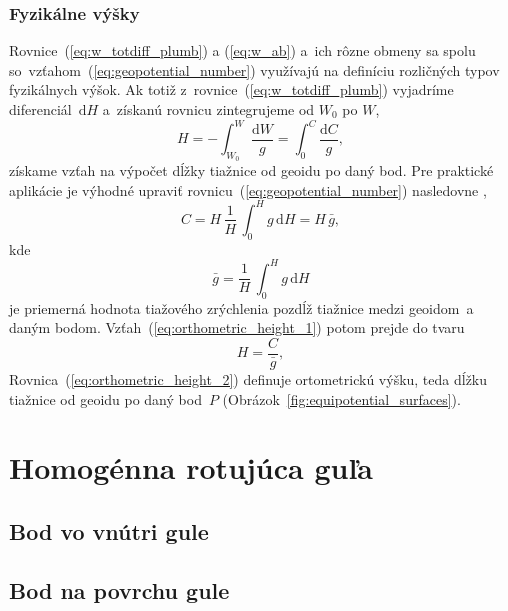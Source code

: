 \documentclass[a4paper,12pt]{book}
\newcommand{\diff}{\mathrm d}
\begin{document}
\subsubsection{Fyzikálne výšky}

Rovnice~(\ref{eq:w_totdiff_plumb}) a (\ref{eq:w_ab}) a~ich rôzne obmeny sa 
spolu so~vzťahom~(\ref{eq:geopotential_number}) využívajú na definíciu 
rozličných typov fyzikálnych výšok.  Ak totiž 
z~rovnice~(\ref{eq:w_totdiff_plumb}) vyjadríme diferenciál~$\diff H$ a~získanú 
rovnicu zintegrujeme od $W_0$ po $W$,
%
\begin{equation}
\label{eq:orthometric_height_1}
H = -\int_{W_0}^{W} \frac{\diff W}{g} = \int_{0}^{C} \frac{\diff C}{g}{,}
\end{equation}
%
získame vzťah na výpočet dĺžky tiažnice od geoidu po daný bod.  Pre praktické 
aplikácie je výhodné upraviť rovnicu~(\ref{eq:geopotential_number}) nasledovne 
\parencite{MoritzPhysicalGeodesy},
%
\begin{equation}
C = H \, \frac{1}{H} \, \int_0^H g \, \diff H = H \, \bar{g}{,}
\end{equation}
%
kde
%
\begin{equation}
\bar{g} = \frac{1}{H} \, \int_0^H g \, \diff H
\end{equation}
%
je priemerná hodnota tiažového zrýchlenia pozdĺž tiažnice medzi geoidom~a daným 
bodom.  Vzťah~(\ref{eq:orthometric_height_1}) potom prejde do tvaru
%
\begin{equation}
\label{eq:orthometric_height_2}
H = \frac{C}{\bar{g}}{,}
\end{equation}
%
Rovnica~(\ref{eq:orthometric_height_2}) definuje ortometrickú výšku, teda dĺžku 
tiažnice od geoidu po daný bod~$P$ (Obrázok~\ref{fig:equipotential_surfaces}).



\section{Homogénna rotujúca guľa}
\label{sec:homogeneous_ball}

\subsection{Bod vo vnútri gule}
\label{sec:homogeneous_ball_int}

\subsection{Bod na povrchu gule}
\label{sec:homogeneous_ball_sur}
\end{document}
